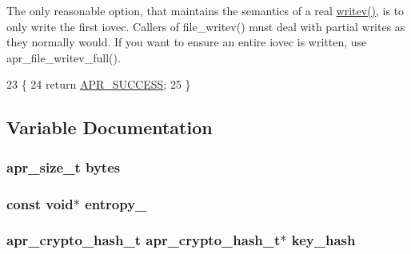 The only reasonable option, that maintains the semantics of a real \hyperlink{apr__arch__os2calls_8h_a3d0f3996136a9b5ab46431c60c746efd}{writev()}, is to only write the first iovec. Callers of file\+\_\+writev() must deal with partial writes as they normally would. If you want to ensure an entire iovec is written, use apr\+\_\+file\+\_\+writev\+\_\+full().
\begin{DoxyCode}
23 \{
24     \textcolor{keywordflow}{return} \hyperlink{group__apr__errno_ga9ee311b7bf1c691dc521d721339ee2a6}{APR\_SUCCESS};
25 \}
\end{DoxyCode}


\subsection{Variable Documentation}
\subsubsection[{\texorpdfstring{bytes}{bytes}}]{ {\bf apr\+\_\+size\+\_\+t} bytes}\hypertarget{group__apr__random_ga393b167dab644f408202cbbcad070e6d}{}\label{group__apr__random_ga393b167dab644f408202cbbcad070e6d}
\subsubsection[{\texorpdfstring{entropy\+\_\+}{entropy_}}]{\setlength{\rightskip}{0pt plus 5cm}const {\bf void}$\ast$ entropy\+\_\+}\hypertarget{group__apr__random_ga0feb49c6530af6eb997e0937caa0f144}{}\label{group__apr__random_ga0feb49c6530af6eb997e0937caa0f144}
\subsubsection[{\texorpdfstring{key\+\_\+hash}{key_hash}}]{ {\bf apr\+\_\+crypto\+\_\+hash\+\_\+t} {\bf apr\+\_\+crypto\+\_\+hash\+\_\+t}$\ast$ key\+\_\+hash}\hypertarget{group__apr__random_ga8cfe7466d86884deb41f9260608ef429}{}\label{group__apr__random_ga8cfe7466d86884deb41f9260608ef429}
